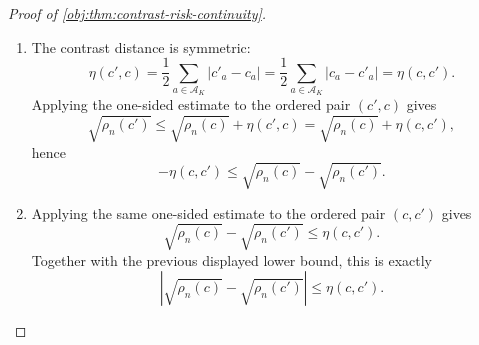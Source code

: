 \begin{proof}[Proof of \cref{obj:thm:contrast-risk-continuity}]
\begin{enumerate}
Taking the maximum over \(z\) in the previous pointwise display gives
\[
\sqrt{\Psi_c(\mathcal D,\widehat\tau^c)}
\le
\sqrt{\Psi_{c'}(\mathcal D,\widehat\tau')}+\eta(c,c').
\]
Since \((\mathcal D,\widehat\tau^c)\) is one admissible procedure for contrast \(c\), taking the infimum over all procedures \((\mathcal D,\widehat\tau')\) for \(c'\) gives
\[
\sqrt{\rho_n(c)}\le \sqrt{\rho_n(c')}+\eta(c,c').
\]

\item The contrast distance is symmetric:
\[
\eta(c',c)
=
\frac12\sum_{a\in\mathcal A_K}|c'_a-c_a|
=
\frac12\sum_{a\in\mathcal A_K}|c_a-c'_a|
=
\eta(c,c').
\]
Applying the one-sided estimate to the ordered pair \((c',c)\) gives
\[
\sqrt{\rho_n(c')}\le \sqrt{\rho_n(c)}+\eta(c',c)
=
\sqrt{\rho_n(c)}+\eta(c,c'),
\]
hence
\[
-\eta(c,c')\le \sqrt{\rho_n(c)}-\sqrt{\rho_n(c')}.
\]

\item Applying the same one-sided estimate to the ordered pair \((c,c')\) gives
\[
\sqrt{\rho_n(c)}-\sqrt{\rho_n(c')}\le \eta(c,c').
\]
Together with the previous displayed lower bound, this is exactly
\[
\left|\sqrt{\rho_n(c)}-\sqrt{\rho_n(c')}\right|
\le
\eta(c,c').
\]
\end{enumerate}
\end{proof}

